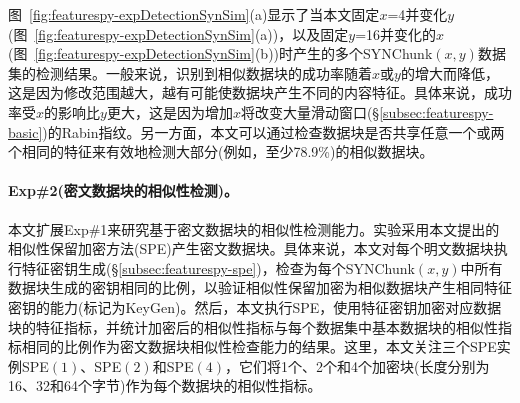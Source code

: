 图~\ref{fig:featurespy-expDetectionSynSim}(a)显示了当本文固定$x$=4并变化$y$(图~\ref{fig:featurespy-expDetectionSynSim}(a))，以及固定$y$=16并变化的$x$(图~\ref{fig:featurespy-expDetectionSynSim}(b))时产生的多个SYNChunk$(x, y)$数据集的检测结果。一般来说，识别到相似数据块的成功率随着$x$或$y$的增大而降低，这是因为修改范围越大，越有可能使数据块产生不同的内容特征。具体来说，成功率受$x$的影响比$y$更大，这是因为增加$x$将改变大量滑动窗口(\S\ref{subsec:featurespy-basic})的Rabin指纹。另一方面，本文可以通过检查数据块是否共享任意一个或两个相同的特征来有效地检测大部分(例如，至少78.9\%)的相似数据块。

\paragraph*{Exp\#2(密文数据块的相似性检测)。}
本文扩展Exp\#1来研究\sysnameF 基于密文数据块的相似性检测能力。实验采用本文提出的相似性保留加密方法(SPE)产生密文数据块。具体来说，本文对每个明文数据块执行特征密钥生成(\S\ref{subsec:featurespy-spe})，检查为每个SYNChunk$(x, y)$中所有数据块生成的密钥相同的比例，以验证相似性保留加密为相似数据块产生相同特征密钥的能力(标记为KeyGen)。然后，本文执行SPE，使用特征密钥加密对应数据块的特征指标，并统计加密后的相似性指标与每个数据集中基本数据块的相似性指标相同的比例作为密文数据块相似性检查能力的结果。这里，本文关注三个SPE实例SPE$(1)$、SPE$(2)$和SPE$(4)$，它们将1个、2个和4个加密块(长度分别为16、32和64个字节)作为每个数据块的相似性指标。

